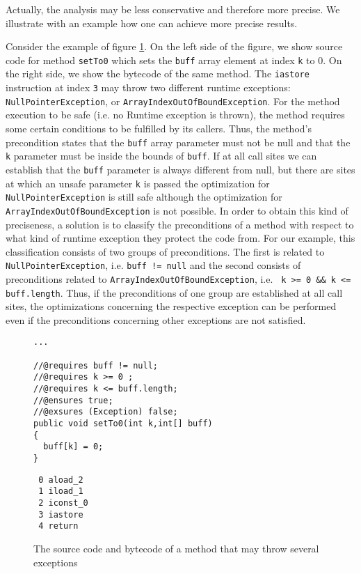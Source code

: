 Actually, the analysis may be less conservative and therefore more precise. We illustrate with an example how
one can achieve more precise results.

Consider the example of figure \ref{fig:jmlpreciseex}. On the left side of the figure, we show source code for method \verb!setTo0! which sets the \verb!buff! array element at index \verb!k! to 0. On the right side, we show the bytecode of the same method. The \texttt{iastore} instruction at index \texttt{3} may throw two different runtime exceptions: \texttt{NullPointerException}, or \texttt{ArrayIndexOutOfBoundException}. For the method execution to be safe (i.e. no Runtime exception is thrown), the method requires some certain conditions to be fulfilled by its callers. Thus, the method's precondition states that the \verb!buff! array parameter must not be null and that the \verb!k! parameter must be inside the bounds of \verb!buff!. If at all call sites we can establish that the \verb!buff! parameter is always different from null, but there are sites at which an unsafe parameter \verb!k! is passed the optimization for \texttt{NullPointerException} is still safe although the optimization for \texttt{ArrayIndexOutOfBoundException} is not possible. In order to obtain this kind of preciseness, a solution is to classify the preconditions of a method with respect to what kind of runtime exception they protect the code from. For our example, this classification consists of two groups of preconditions. The first is related to \texttt{NullPointerException}, i.e. \texttt{buff != null} and the second consists of preconditions related to \texttt{ArrayIndexOutOfBoundException}, i.e. \verb! k >= 0 && k <= buff.length!. Thus, if the preconditions of one group are established at all call sites, the optimizations concerning the respective exception can be performed even if the preconditions concerning other exceptions are not satisfied.

\begin{figure}
\begin{minipage}[b]{0.5\linewidth}
\begin{verbatim}
...

//@requires buff != null;
//@requires k >= 0 ;
//@requires k <= buff.length;
//@ensures true;
//@exsures (Exception) false;
public void setTo0(int k,int[] buff)
{
  buff[k] = 0;
}
\end{verbatim}
\end{minipage}
\hspace{.5cm}
\begin{minipage}[b]{0.4\linewidth}
 \begin{verbatim}
 0 aload_2
 1 iload_1
 2 iconst_0
 3 iastore
 4 return
\end{verbatim}
\end{minipage}
\caption{The source code and bytecode of a method that may throw several exceptions}
\label{fig:jmlpreciseex}
\end{figure}

